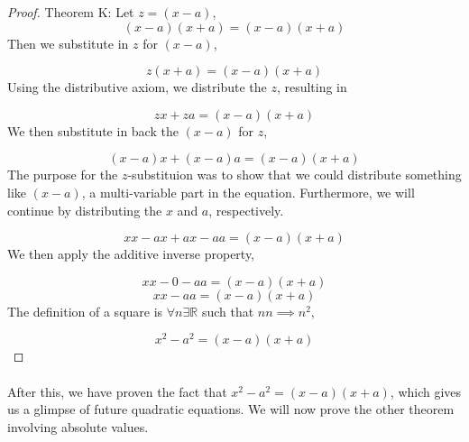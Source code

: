 \documentclass[a4paper, 12pt]{article}
\begin{document}
\begin{proof}
Theorem K: Let \(z=(x-a)\),
\begin{equation}
(x-a)(x+a) = (x-a)(x+a)
\end{equation}
Then we substitute in \(z\) for \((x-a)\),

\begin{equation}
z(x+a) = (x-a)(x+a)
\end{equation}
Using the distributive axiom, we distribute the \(z\), resulting in

\begin{equation}
zx + za = (x-a)(x+a)
\end{equation}
We then substitute in back the \((x-a)\) for \(z\),

\begin{equation}
(x-a)x + (x-a)a = (x-a)(x+a)
\end{equation}
The purpose for the \(z\)-substituion was to show that we could distribute something like \((x-a)\), a multi-variable part in the equation. Furthermore, we will continue by distributing the \(x\) and \(a\), respectively.

\begin{equation}
xx-ax + ax - aa = (x-a)(x+a)
\end{equation}
We then apply the additive inverse property, 

\begin{equation}
xx-0-aa = (x-a)(x+a)
\end{equation}
\begin{equation}
xx-aa = (x-a)(x+a)
\end{equation}
The definition of a square is \(\forall n \exists \mathbb{R} \) such that \(nn \implies {n}^{2}\),

\begin{equation}
x^2 - a^2 = (x-a)(x+a)
\end{equation}
\end{proof}

\paragraph{}
After this, we have proven the fact that \({x}^{2} - {a}^{2} = (x-a)(x+a) \), which gives us a glimpse of future quadratic equations. We will now prove the other theorem involving absolute values.
\end{document}
